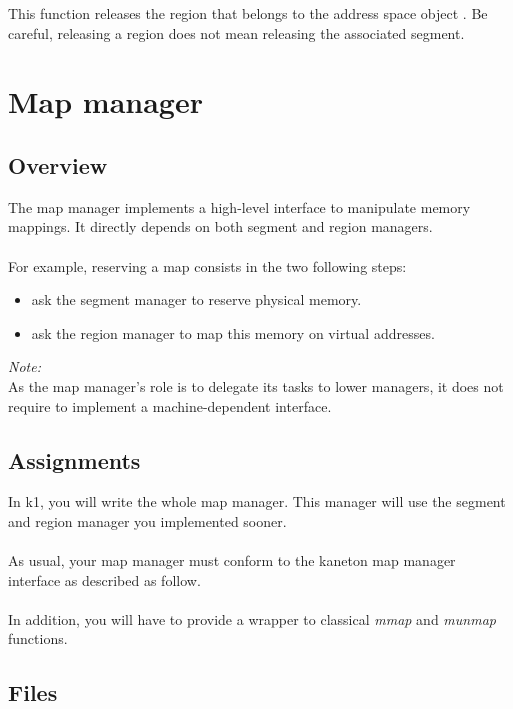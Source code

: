 {
  This function releases the region  that
  belongs to the address space object . Be
  careful, releasing a region does not mean releasing the
  associated segment.
}

%
%

\newpage

\section{Map manager}

\subsection*{Overview}
The map manager implements a high-level interface to manipulate memory mappings.
It directly depends on both segment and region managers.\\
\\
For example, reserving a map consists in the two following steps:
\begin{itemize}
\item ask the segment manager to reserve physical memory.
\item ask the region manager to map this memory on virtual addresses.\\
\end{itemize}

{\em Note:}\\
As the map manager's role is to delegate its tasks to lower managers, it does
not require to implement a machine-dependent interface.\\

\subsection*{Assignments}
In k1, you will write the whole map manager. This manager will use the segment
and region manager you implemented sooner.\\
\\
As usual, your map manager must conform to the kaneton map manager interface as
described as follow.\\
\\
In addition, you will have to provide a wrapper to classical
\emph{mmap} and \emph{munmap} functions.

\subsection*{Files}

